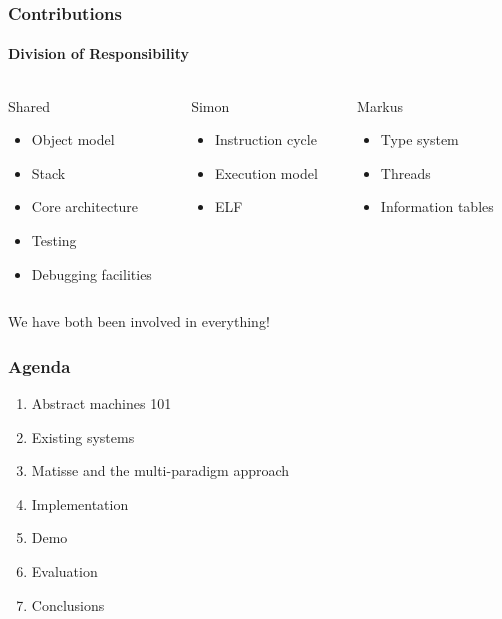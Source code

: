 \documentclass[handout]{beamer}
\begin{document}
\begin{frame}
  \frametitle{Contributions}
  \framesubtitle{Division of Responsibility}

  \begin{columns}[onlytextwidth, t]
    \begin{column}{0.33\textwidth}
      Shared
      \fontsize{9pt}{15}\selectfont
      \begin{itemize}
      \item Object model
      \item Stack
      \item Core architecture
      \item Testing
      \item Debugging facilities
      \end{itemize}
    \end{column}

    \pause{}

    \begin{column}{0.33\textwidth}
      Simon
      \fontsize{9pt}{15}\selectfont
      \begin{itemize}
      \item Instruction cycle
      \item Execution model
      \item ELF
      \end{itemize}
    \end{column}

    \pause{}

    \begin{column}{0.33\textwidth}
      Markus
      \fontsize{9pt}{15}\selectfont
      \begin{itemize}
      \item Type system
      \item Threads
      \item Information tables
      \end{itemize}
    \end{column}
  \end{columns}

  \pause{}

  \vspace{30pt}
  \centering
  We have both been involved in everything!

\end{frame}

\begin{frame}
  \frametitle{Agenda}
  \fontsize{11pt}{20}\selectfont
  \begin{enumerate}
  \item Abstract machines 101
    \pause{}
  \item Existing systems
    \pause{}
  \item Matisse and the multi-paradigm approach
    \pause{}
  \item Implementation
    \pause{}
  \item Demo
    \pause{}
  \item Evaluation
    \pause{}
  \item Conclusions
  \end{enumerate}
\end{frame}
\end{document}
